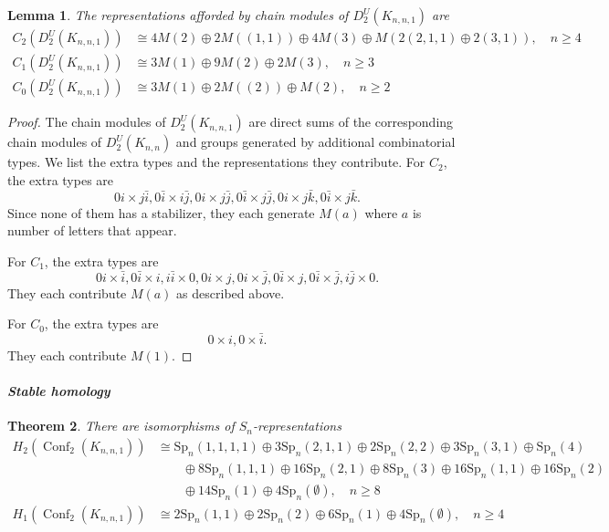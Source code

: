 \documentclass[12pt]{amsart}
\newtheorem{thm}{Theorem}[section]
\newtheorem{lem}[thm]{Lemma}
\theoremstyle{definition}
\newcommand{\conf}{\operatorname{Conf}}
\newcommand{\Sp}{\mathrm{Sp}}
\begin{document}
\begin{lem}
The representations afforded by chain modules of $D^U_2(K_{n,n,1})$ are
\begin{align*}
C_2(D^U_2(K_{n,n,1})) &\cong 4M(2)\oplus 2M((1,1))\oplus 4M(3)\oplus M(2(2,1,1)\oplus 2(3,1)),\quad n\geq 4\\
C_1(D^U_2(K_{n,n,1})) &\cong 3M(1)\oplus 9M(2)\oplus 2M(3),\quad n\geq 3\\
C_0(D^U_2(K_{n,n,1})) &\cong 3M(1)\oplus 2M((2)) \oplus M(2),\quad n\geq 2
\end{align*}
\end{lem}

\begin{proof}
    The chain modules of $D^U_2(K_{n,n,1})$ are direct sums of the corresponding chain modules of $D^U_2(K_{n,n})$ and groups generated by additional combinatorial types. We list the extra types and the representations they contribute. For $C_2$, the extra types are \[0i\times j\bar i,0\bar i\times i\bar j,0i\times j\bar j,0\bar i\times j\bar j,0i\times j\bar k,0\bar i \times j\bar k.\] Since none of them has a stabilizer, they each generate $M(a)$ where $a$ is number of letters that appear.

    For $C_1$, the extra types are \[0i\times \bar i,0\bar i\times i,i\bar i\times0,0i\times j,0i\times \bar j,0\bar i\times j,0\bar i\times\bar j,i\bar j\times 0.\] They each contribute $M(a)$ as described above.

    For $C_0$, the extra types are \[0\times i,0\times \bar i.\] They each contribute $M(1)$.
\end{proof}

\paragraph{\textit{Stable homology}}
\begin{thm}\label{thm: ordered tripartite}
    There are isomorphisms of $S_n$-representations
    \begin{align*}
        H_2(\conf_2(K_{n,n,1})) &\cong \Sp_n(1, 1, 1, 1) \oplus 3\Sp_n(2, 1, 1) \oplus 2\Sp_n(2, 2) \oplus 3\Sp_n(3, 1) \oplus \Sp_n(4) \\
        &\qquad \oplus 8\Sp_n(1, 1, 1) \oplus 16\Sp_n(2, 1) \oplus 8\Sp_n(3) \oplus 16\Sp_n(1, 1) \oplus 16\Sp_n(2) \\
        &\qquad\oplus 14\Sp_n(1) \oplus 4\Sp_n(\emptyset),\quad n\geq 8\\
        H_1(\conf_2(K_{n,n,1})) &\cong 2\Sp_n(1, 1) \oplus 2\Sp_n(2) \oplus 6\Sp_n(1) \oplus 4\Sp_n(\emptyset), \quad n\geq 4
    \end{align*}
\end{thm}
\end{document}
